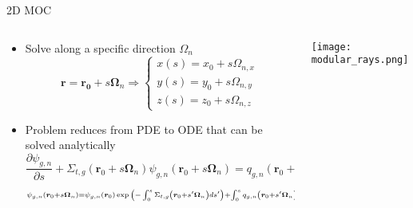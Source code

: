 \begin{frame}[t]{2D MOC}
    
    \begin{columns}
        \begin{column}{0.6\textwidth}
            \begin{itemize}
                \item Solve along a specific direction $\Omega_n$
                \begin{equation*}\scriptstyle
                \bm r = \bm {r_0} + s \bm \Omega_n \Rightarrow \begin{cases} 
                x\left(s\right) = x_0 + s\Omega_{n,x} \\ y\left(s\right) = y_0 + 
                s\Omega_{n,y} \\ z\left(s\right) = z_0 + s\Omega_{n,z} \end{cases}
                \end{equation*}
                \item Problem reduces from PDE to ODE that can be solved analytically
                \begin{equation*}\scriptstyle
                \frac{\partial \psi_{g,n}}{\partial s} + \Sigma_{t,g}\left(\bm r_0 + 
                s\bm\Omega_n\right)\psi_{g,n}\left(\bm r_0 + s\bm\Omega_n\right) = 
                q_{g,n}\left(\bm r_0 + s\bm\Omega_n\right)
                \end{equation*}
                \begin{dmath*}\scriptstyle
                    {\psi_{g,n}\left(\bm r_0 + s\bm\Omega_n\right) = \psi_{g,n}\left(\bm 
                        r_0\right)\exp{\left(-\intop_0^s \Sigma_{t,g}\left(\bm r_0 + 
                            s'\bm\Omega_n\right)ds'\right)}} + {\intop_0^s q_{g,n}\left(\bm r_0 + 
                        s'\bm\Omega_n\right)\exp{\left(-\intop_0^{s'} \Sigma_{t,g}\left(\bm r_0 
                            + s''\bm\Omega_n\right)ds''\right)}ds'}
                \end{dmath*}
            \end{itemize}
        \end{column}
        \begin{column}{0.4\textwidth}
            \texttt{[image: modular\_rays.png]}
        \end{column}
    \end{columns}
    
\end{frame} 

